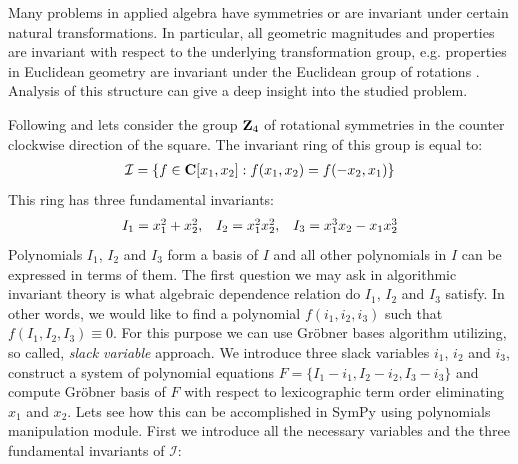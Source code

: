 Many problems in applied algebra have symmetries or are invariant under certain natural
transformations. In particular, all geometric magnitudes and properties are invariant with
respect to the underlying transformation group, e.g. properties in Euclidean geometry are
invariant under the Euclidean group of rotations \cite{Sturmfels2008invariant}. Analysis of
this structure can give a deep insight into the studied problem.

Following \cite{Buchberger2001systems} and \cite{Sturmfels2008invariant} lets consider the group $\mathbf{Z}_4$
of rotational symmetries in the counter clockwise direction of the square. The invariant ring of
this group is equal to:
\begin{gather}
\begin{split}\mathcal{I} = \left\{ f \in \mathbf{C}[x_1, x_2] : f(x_1, x_2) = f(-x_2, x_1) \right\}\end{split}\notag
\end{gather}
This ring has three fundamental invariants:
\begin{gather}
\begin{split}\begin{array}{ccc}
I_1 = x_1^2 + x_2^2, & I_2 = x_1^2 x_2^2, & I_3 = x_1^3 x_2 - x_1 x_2^3
\end{array}\end{split}\notag
\end{gather}
Polynomials $I_1$, $I_2$ and $I_3$ form a basis of $I$ and all other polynomials in $I$
can be expressed in terms of them. The first question we may ask in algorithmic invariant
theory is what algebraic dependence relation do $I_1$, $I_2$ and $I_3$ satisfy. In other
words, we would like to find a polynomial $f(i_1, i_2, i_3)$ such that $f(I_1, I_2, I_3)
\equiv 0$. For this purpose we can use Gröbner bases algorithm utilizing, so called,
\emph{slack variable} approach. We introduce three slack variables $i_1$, $i_2$ and $i_3$,
construct a system of polynomial equations $F = \{I_1 - i_1, I_2 - i_2, I_3 - i_3\}$
and compute Gröbner basis of $F$ with respect to lexicographic term order eliminating
$x_1$ and $x_2$. Lets see how this can be accomplished in SymPy using polynomials
manipulation module. First we introduce all the necessary variables and the three
fundamental invariants of $\mathcal{I}$:


